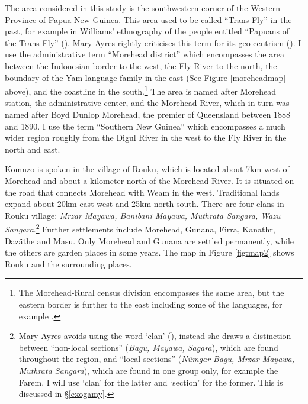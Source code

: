 The area considered in this study is the southwestern corner of the Western Province of Papua New Guinea. This area used to be called ``Trans-Fly'' in the past, for example in Williams' ethnography of the  people entitled ``Papuans of the Trans-Fly'' (\citeyear{Williams:1936transfly}). Mary Ayres rightly criticises this term for its geo-centrism (\citeyear[1]{Ayres:ws}). I use the administrative term ``Morehead district'' which encompasses the area between the Indonesian border to the west, the Fly River to the north, the boundary of the Yam language family in the east (See Figure \ref{moreheadmap} above), and the coastline in the south.\footnote{The Morehead-Rural census division encompasses the same area, but the eastern border is further to the east including some of the  languages, for example .} The area is named after Morehead station, the administrative center, and the Morehead River, which in turn was named after Boyd Dunlop Morehead, the premier of Queensland between 1888 and 1890. I use the term ``Southern New Guinea'' which encompasses a much wider region roughly from the Digul River in the west to the Fly River in the north and east.%

Komnzo is spoken in the village of Rouku, which is located about 7km west of Morehead and about a kilometer north of the Morehead River. It is situated on the road that connects Morehead with Weam in the west. Traditional lands expand about 20km east-west and 25km north-south. There are four clans in Rouku village: \emph{Mrzar Mayawa, Banibani Mayawa, Muthrata Sangara, Wazu Sangara}.\footnote{Mary Ayres avoids using the word `clan' (\citeyear[142]{Ayres:ws}), instead she draws a distinction between ``non-local sections'' (\emph{Bagu, Mayawa, Sagara}), which are found throughout the region, and ``local-sections'' (\emph{Nümgar Bagu, Mrzar Mayawa, Muthrata Sangara}), which are found in one group only, for example the Farem. I will use `clan' for the latter and `section' for the former. This is discussed in \S\ref{exogamy}.} Further settlements include Morehead, Gunana, Firra, Kanathr, Ŋazäthe and Masu. Only Morehead and Gunana are settled permanently, while the others are garden places in some years. The map in Figure \ref{fig:map2} shows Rouku and the surrounding places.

